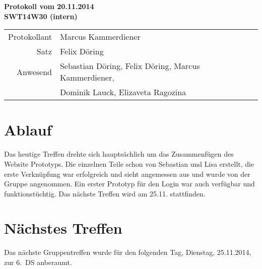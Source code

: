 \documentclass{scrartcl}
\begin{document}
\begin{center}
\LARGE \bf{Protokoll vom 20.11.2014 \\
SWT14W30 (intern)}
\end{center}

\begin{tabular}{rp{10cm}}
Protokollant & Marcus Kammerdiener \\
Satz & Felix Döring \\
Anwesend & Sebastian Döring, Felix Döring, Marcus Kammerdiener,\\
& Dominik Lauck, Elizaveta Ragozina \\
\end{tabular}

\vspace*{3em}

\section{Ablauf}
Das heutige Treffen drehte sich hauptsächlich um das Zusammenfügen des Website Prototyps. Die einzelnen Teile
schon von Sebastian und Lisa erstellt, die erste Verknüpfung war erfolgreich und sieht angemessen aus und wurde
von der Gruppe angenommen. Ein erster Prototyp für den Login war auch verfügbar und funktionstüchtig.
Das nächste Treffen wird am 25.11. stattfinden.
\section{N\"achstes Treffen}
Das nächste Gruppentreffen wurde für den folgenden Tag, Dienstag, 25.11.2014, zur 6.~DS anberaumt.
\end{document}
